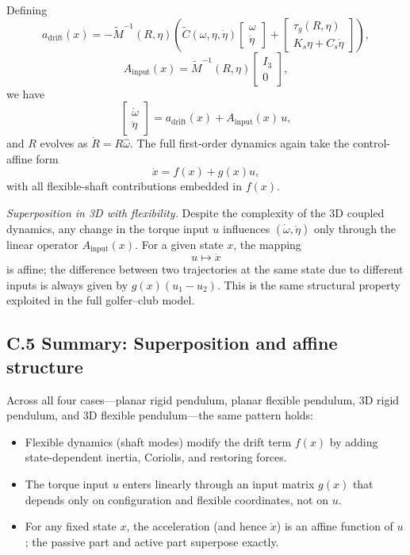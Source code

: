 \documentclass[12pt]{article}
\begin{document}
Defining
\[
  a_{\mathrm{drift}}(x)
  =
  -\tilde{M}^{-1}(R,\eta)
  \left(
    \tilde{C}(\omega,\eta,\dot{\eta})
    \begin{bmatrix}
      \omega \\ \dot{\eta}
    \end{bmatrix}
    + 
    \begin{bmatrix}
      \tau_g(R,\eta) \\ K_s \eta + C_s \dot{\eta}
    \end{bmatrix}
  \right),
\]
\[
  A_{\mathrm{input}}(x)
  =
  \tilde{M}^{-1}(R,\eta)
  \begin{bmatrix}
    I_3 \\ 0
  \end{bmatrix},
\]
we have
\[
  \begin{bmatrix}
    \dot{\omega} \\[0.2em]
    \ddot{\eta}
  \end{bmatrix}
  =
  a_{\mathrm{drift}}(x) + A_{\mathrm{input}}(x)\,u,
\]
and \(R\) evolves as \(\dot{R} = R \hat{\omega}\). The full first-order dynamics again take the control-affine form
\[
  \dot{x} = f(x) + g(x)u,
\]
with all flexible-shaft contributions embedded in \(f(x)\).

\emph{Superposition in 3D with flexibility.}  
Despite the complexity of the 3D coupled dynamics, any change in the torque input \(u\) influences \((\dot{\omega},\ddot{\eta})\) only through the linear operator \(A_{\mathrm{input}}(x)\). For a given state \(x\), the mapping
\[
  u \mapsto \dot{x}
\]
is affine; the difference between two trajectories at the same state due to different inputs is always given by \(g(x)(u_1-u_2)\). This is the same structural property exploited in the full golfer--club model.

\subsection{C.5 \quad Summary: Superposition and affine structure}

Across all four cases—planar rigid pendulum, planar flexible pendulum, 3D rigid pendulum, and 3D flexible pendulum—the same pattern holds:
\begin{itemize}
  \item Flexible dynamics (shaft modes) modify the drift term \(f(x)\) by adding state-dependent inertia, Coriolis, and restoring forces.
  \item The torque input \(u\) enters linearly through an input matrix \(g(x)\) that depends only on configuration and flexible coordinates, not on \(u\).
  \item For any fixed state \(x\), the acceleration (and hence \(\dot{x}\)) is an affine function of \(u\); the passive part and active part superpose exactly.
\end{itemize}
\end{document}
